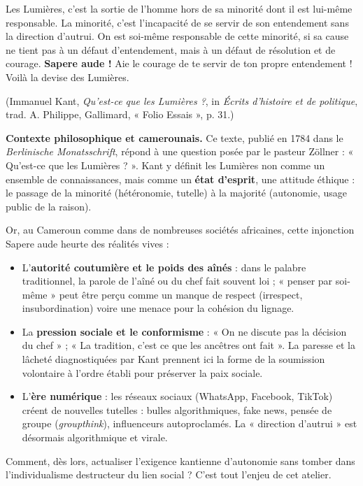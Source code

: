 \documentclass[11pt]{article}
\newcommand{\cle}[1]{{\popxbold\color{popdark}#1}}
\newcounter{popsec}
\newcounter{popsub}
\newcommand{\courssub}[1]{%
  \stepcounter{popsub}%
  \par\vspace{9pt}\noindent{\popxbold\fontsize{11.5}{13}\selectfont\color{popink}{\color{poporange}\thepopsec.\thepopsub}\hspace{6pt}#1}\par\nopagebreak\vspace{4pt}
}
\begin{document}
\courssub{Situation}
\begin{experience}
\guillemotleft Les Lumières, c'est la sortie de l'homme hors de sa minorité dont il est lui-même responsable. La minorité, c'est l'incapacité de se servir de son entendement sans la direction d'autrui. On est soi-même responsable de cette minorité, si sa cause ne tient pas à un défaut d'entendement, mais à un défaut de résolution et de courage. \textbf{Sapere aude !} Aie le courage de te servir de ton propre entendement ! Voilà la devise des Lumières. \guillemotright
\par
(Immanuel Kant, \emph{Qu'est-ce que les Lumières ?}, in \emph{Écrits d'histoire et de politique}, trad. A. Philippe, Gallimard, « Folio Essais », p. 31.)
\end{experience}

\textbf{Contexte philosophique et camerounais.}
Ce texte, publié en 1784 dans le \emph{Berlinische Monatsschrift}, répond à une question posée par le pasteur Zöllner : « Qu'est-ce que les Lumières ? ». Kant y définit les Lumières non comme un ensemble de connaissances, mais comme un \textbf{état d'esprit}, une \cle{attitude éthique} : le passage de la \cle{minorité} (hétéronomie, tutelle) à la \cle{majorité} (autonomie, usage public de la raison).

Or, au Cameroun comme dans de nombreuses sociétés africaines, cette injonction \guillemotleft Sapere aude \guillemotright heurte des réalités vives :
\begin{itemize}
    \item L'\textbf{autorité coutumière et le poids des aînés} : dans le \cle{palabre} traditionnel, la parole de l'aîné ou du chef fait souvent loi ; « penser par soi-même » peut être perçu comme un manque de respect (\cle{irrespect}, \cle{insubordination}) voire une menace pour la \cle{cohésion du lignage}.
    \item La \textbf{pression sociale et le conformisme} : « On ne discute pas la décision du chef » ; « La tradition, c'est ce que les ancêtres ont fait ». La \cle{paresse} et la \cle{lâcheté} diagnostiquées par Kant prennent ici la forme de la \cle{soumission volontaire} à l'ordre établi pour préserver la paix sociale.
    \item L'\textbf{ère numérique} : les réseaux sociaux (WhatsApp, Facebook, TikTok) créent de nouvelles \cle{tutelles} : bulles algorithmiques, \cle{fake news}, \cle{pensée de groupe} (\emph{groupthink}), influenceurs autoproclamés. La « direction d'autrui » est désormais algorithmique et virale.
\end{itemize}
Comment, dès lors, actualiser l'exigence kantienne d'autonomie sans tomber dans l'individualisme destructeur du lien social ? C'est tout l'enjeu de cet atelier.
\end{document}
